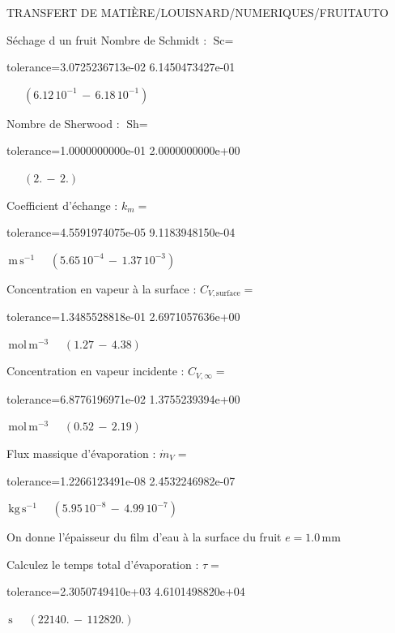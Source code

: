 \documentclass[12pt]{article}
\begin{document}
\begin{quiz}{TRANSFERT DE MATIÈRE/LOUISNARD/NUMERIQUES/FRUITAUTO}
\begin{cloze}{Séchage d un fruit}
Nombre de Schmidt : $\text{Sc} =  $
\begin{numerical}[points=1] 
\item[tolerance={3.0725236713e-02}] 6.1450473427e-01 
\end{numerical} 
 $\,$ 
 $ \quad ( 6.12 \, 10^{-1}  \, - \,  6.18 \, 10^{-1} ) $ 

Nombre de Sherwood : $\text{Sh} =  $
\begin{numerical}[points=2] 
\item[tolerance={1.0000000000e-01}] 2.0000000000e+00 
\end{numerical} 
 $\,$ 
 $ \quad (2. \, - \, 2.) $ 

Coefficient d'échange : $k_m =  $
\begin{numerical}[points=1] 
\item[tolerance={4.5591974075e-05}] 9.1183948150e-04 
\end{numerical} 
 $\,  \mathrm{m}\,  \mathrm{s}^{-1}$ 
 $ \quad ( 5.65 \, 10^{-4}  \, - \,  1.37 \, 10^{-3} ) $ 

Concentration en vapeur à la surface : $C_{V, \text{surface}} =  $
\begin{numerical}[points=2] 
\item[tolerance={1.3485528818e-01}] 2.6971057636e+00 
\end{numerical} 
 $\,  \mathrm{mol}\,  \mathrm{m}^{-3}$ 
 $ \quad (1.27 \, - \, 4.38) $ 

Concentration en vapeur incidente : $C_{V, \infty} =  $
\begin{numerical}[points=2] 
\item[tolerance={6.8776196971e-02}] 1.3755239394e+00 
\end{numerical} 
 $\,  \mathrm{mol}\,  \mathrm{m}^{-3}$ 
 $ \quad (0.52 \, - \, 2.19) $ 

Flux massique d'évaporation : $\dot{m}_V =  $
\begin{numerical}[points=1] 
\item[tolerance={1.2266123491e-08}] 2.4532246982e-07 
\end{numerical} 
 $\,  \mathrm{kg}\,  \mathrm{s}^{-1}$ 
 $ \quad ( 5.95 \, 10^{-8}  \, - \,  4.99 \, 10^{-7} ) $ 

 

On donne l'épaisseur du film d'eau à la surface du fruit $e = 1.0\,  \mathrm{mm} $

Calculez le temps total d'évaporation : $\tau =  $
\begin{numerical}[points=2] 
\item[tolerance={2.3050749410e+03}] 4.6101498820e+04 
\end{numerical} 
 $\,  \mathrm{s}$ 
 $ \quad (22140. \, - \, 112820.) $ 


\end{cloze}
\end{quiz}
\end{document}

